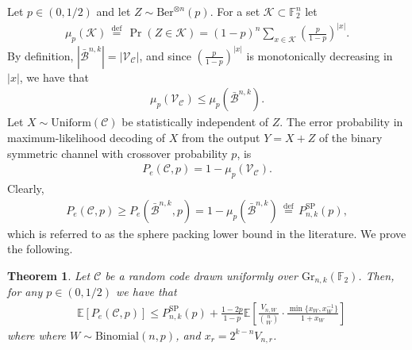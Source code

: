 \documentclass[article,doublecolumn]{IEEEtran}
\newcommand{\F}{{\mathbb{F}}}
\newcommand{\EE}{{\mathbb{E}}}
\newcommand{\df}{{\, \stackrel{\mathrm{def}}{=}\, }}
\newcommand{\PSP}{P^{\mathrm{SP}}_{n,k}}
\newcommand{\BB}{{\mathcal{B}}}
\newcommand{\CC}{{\mathcal{C}}}
\newcommand{\Gr}{{\mathrm{Gr}}}
\newcommand{\Unif}{\mathrm{Uniform}}
\newcommand{\KK}{{\mathcal{K}}}
\newcommand{\VC}{\mathcal{V}_{\mathcal{C}}}
\newcommand{\Beq}{\bar{\BB}^{n,k}}
\newtheorem{thm}{Theorem}[section]
\begin{document}
Let $p\in(0,1/2)$ and let $Z\sim\mathrm{Ber}^{\otimes n}(p)$. For a set $\KK\subset\F_2^n$ let
\begin{align}
\mu_p(\KK)\df\Pr(Z\in\KK)=(1-p)^n\sum_{x\in\KK} \left(\frac{p}{1-p}\right)^{|x|}.
\end{align}
By definition, $|\Beq|=|\VC|$, and since $\left(\frac{p}{1-p}\right)^{|x|}$ is monotonically decreasing in $|x|$, we have that
\begin{align}
 \mu_p(\VC)\leq \mu_p(\Beq).   
\end{align}
Let $X\sim\Unif(\CC)$ be statistically independent of $Z$. The error probability in maximum-likelihood decoding of  $X$ from the output $Y=X+Z$ of the binary symmetric channel with crossover probability $p$, is 
\begin{align}
 P_e(\CC,p)=1-\mu_p(\VC).
\end{align}
Clearly,
\begin{align}
P_e(\CC,p)\geq P_e(\Beq,p)=1-\mu_p(\Beq)\df \PSP(p),    
\end{align}
which is referred to as the sphere packing lower bound in the literature. We prove the following.
\begin{thm}
Let $\CC$ be a random code drawn uniformly over $\Gr_{n,k}(\F_2)$. Then, for any $p\in(0,1/2)$ we have that
\begin{align}
&\mathbb{E}[P_e(\CC,p)]\leq \PSP(p)+\frac{1-2p}{1-p} \EE\left[\frac{V_{n,W}}{{{n}\choose{W}}}\cdot\frac{\min\{ x_{W},x^{-1}_{W}\}}{1+x_{W}} \right] \label{eq:PeAddbound1}
\end{align}
where where $W\sim\mathrm{Binomial}(n,p)$, and $x_r=2^{k-n}V_{n,r}$.
\label{thm:PeRCUB}
\end{thm}
\end{document}
